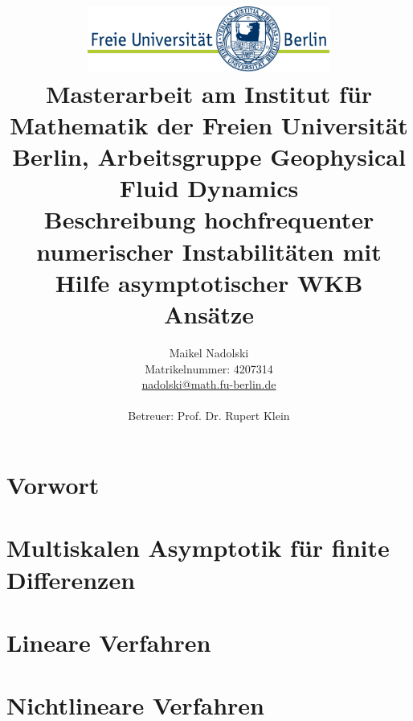 \documentclass[a4paper
               ,11pt%
               ]{scrreprt}
\title{\includegraphics[width=0.6\textwidth]{pictures/logo}\\
{\normalsize Masterarbeit am Institut für Mathematik der Freien Universität Berlin, Arbeitsgruppe Geophysical Fluid Dynamics}\\[6ex]
Beschreibung hochfrequenter numerischer Instabilitäten mit Hilfe asymptotischer WKB Ansätze}
\author{Maikel Nadolski\\
{\normalsize Matrikelnummer: 4207314}\\
{\normalsize \href{mailto:nadolski@math.fu-berlin.de}{nadolski@math.fu-berlin.de}}\\\\
{\normalsize Betreuer: Prof. Dr. Rupert Klein}}
\numberwithin{equation}{section}
\begin{document}
\maketitle

\tableofcontents

\chapter{Vorwort}
\chapter{Multiskalen Asymptotik für finite Differenzen}
\chapter{Lineare Verfahren}

\chapter{Nichtlineare Verfahren}


\end{document}

